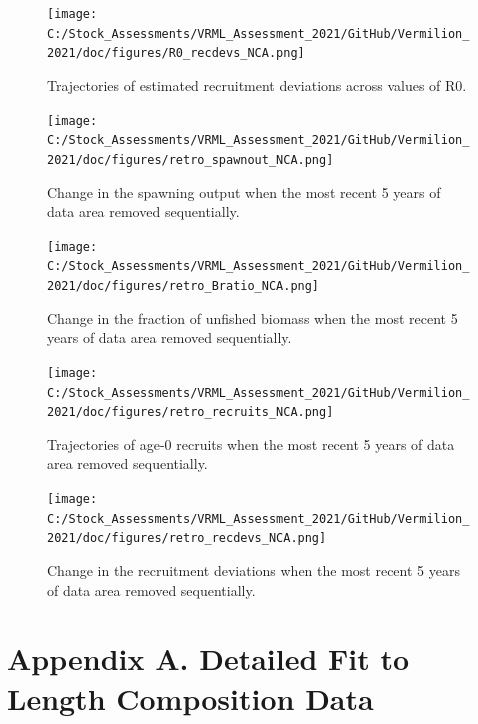 \documentclass[11pt,
  english,
]{article}
\begin{document}
\begin{figure}
\centering
\texttt{[image: C:/Stock\_Assessments/VRML\_Assessment\_2021/GitHub/Vermilion\_2021/doc/figures/R0\_recdevs\_NCA.png]}
\caption{Trajectories of estimated recruitment deviations across values of R0.\label{fig:r0-recdevs}}
\end{figure}

\begin{figure}
\centering
\texttt{[image: C:/Stock\_Assessments/VRML\_Assessment\_2021/GitHub/Vermilion\_2021/doc/figures/retro\_spawnout\_NCA.png]}
\caption{Change in the spawning output when the most recent 5 years of data area removed sequentially.\label{fig:retro-spawnb}}
\end{figure}

\begin{figure}
\centering
\texttt{[image: C:/Stock\_Assessments/VRML\_Assessment\_2021/GitHub/Vermilion\_2021/doc/figures/retro\_Bratio\_NCA.png]}
\caption{Change in the fraction of unfished biomass when the most recent 5 years of data area removed sequentially.\label{fig:retro-bratio}}
\end{figure}

\begin{figure}
\centering
\texttt{[image: C:/Stock\_Assessments/VRML\_Assessment\_2021/GitHub/Vermilion\_2021/doc/figures/retro\_recruits\_NCA.png]}
\caption{Trajectories of age-0 recruits when the most recent 5 years of data area removed sequentially.\label{fig:retro-recruits}}
\end{figure}

\begin{figure}
\centering
\texttt{[image: C:/Stock\_Assessments/VRML\_Assessment\_2021/GitHub/Vermilion\_2021/doc/figures/retro\_recdevs\_NCA.png]}
\caption{Change in the recruitment deviations when the most recent 5 years of data area removed sequentially.\label{fig:retro-recdevs}}
\end{figure}

\newpage


\hypertarget{appendix-a.-detailed-fit-to-length-composition-data}{%
\section*{Appendix A. Detailed Fit to Length Composition Data}\label{appendix-a.-detailed-fit-to-length-composition-data}}
\end{document}
